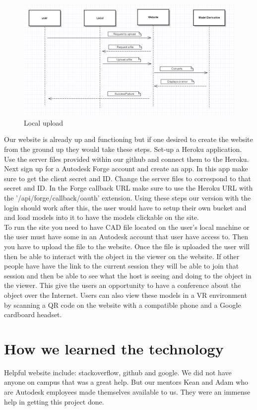 \documentclass[letterpaper, 10pt, draftclsnofoot, compsoc, onecolumn]{IEEEtran}
\begin{document}
\newpage
\begin{figure}[ht]
	\includegraphics[scale=0.6]{localUpload.png}
	\caption{Local upload}
\end{figure}
\newpage
Our website is already up and functioning but if one desired to create the website from the ground up they would take these steps. Set-up a Heroku application. Use the server files provided within our github and connect them to the Heroku. Next sign up for a Autodesk Forge account and create an app. In this app make sure to get the client secret and ID. Change the server files to correspond to that secret and ID. In the Forge callback URL make sure to use the Heroku URL with the '/api/forge/callback/oauth' extension. Using these steps our version with the login should work after this, the user would have to setup their own bucket and and load models into it to have the models clickable on the site.\\

To run the site you need to have CAD file located on the user's local machine or the user must have some in an Autodesk account that user have access to. Then you have to upload the file to the website. Once the file is uploaded the user will then be able to interact with the object in the viewer on the website. If other people have have the link to the current session they will be able to join that session and then be able to see what the host is seeing and doing to the object in the viewer. This give the users an opportunity to have a conference about the object over the Internet. Users can also view these models in a VR environment by scanning a QR code on the website with a compatible phone and a Google cardboard headset.\\

\section{How we learned the technology}
Helpful website include: stackoverflow, github and google. We did not have anyone on campus that was a great help. But our mentors Kean and Adam who are Autodesk employees made themselves available to us. They were an immense help in getting this project done.
\end{document}
